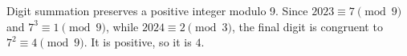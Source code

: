 Digit summation preserves a positive integer modulo 9. Since $2023\equiv7\pmod9$ and $7^3\equiv1\pmod9$, while $2024\equiv2\pmod3$, the final digit is congruent to $7^2\equiv4\pmod9$. It is positive, so it is $\boxed4$.
